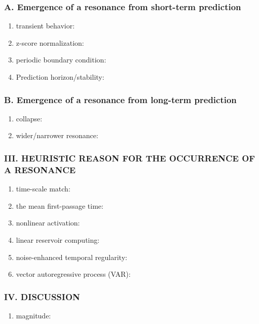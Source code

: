 \subsubsection{A. Emergence of a resonance from short-term prediction}
\begin{enumerate}
  \item transient behavior:
  \item z-score normalization: 
  \item periodic boundary condition:
  \item Prediction horizon/stability: 
\end{enumerate}

\subsubsection{B. Emergence of a resonance from long-term prediction}
\begin{enumerate}
  \item collapse:
  \item wider/narrower resonance:
\end{enumerate}

\subsubsection{III. HEURISTIC REASON FOR THE OCCURRENCE
OF A RESONANCE}
\begin{enumerate}
  \item time-scale match:
  \item the mean first-passage time:
  \item nonlinear activation: 
  \item linear reservoir computing:
  \item noise-enhanced temporal regularity:
  \item vector autoregressive process (VAR): 
\end{enumerate}

\subsubsection{IV. DISCUSSION}
\begin{enumerate}
  \item magnitude: 
\end{enumerate}

